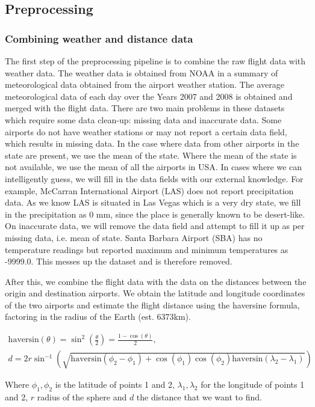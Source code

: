 \documentclass[letterpaper,11pt]{article}
\begin{document}
\subsection{Preprocessing}
\subsubsection{Combining weather and distance data}
The first step of the preprocessing pipeline is to combine the raw flight data with weather data. The weather data is obtained from NOAA in a summary of meteorological data obtained from the airport weather station. The average meteorological data of each day over the Years 2007 and 2008 is obtained and merged with the flight data. There are two main problems in these datasets which require some data clean-up: missing data and inaccurate data. Some airports do not have weather stations or may not report a certain data field, which results in missing data. In the case where data from other airports in the state are present, we use the mean of the state. Where the mean of the state is not available, we use the mean of all the airports in USA. In cases where we can intelligently guess, we will fill in the data fields with our external knowledge. For example, McCarran International Airport (LAS) does not report precipitation data. As we know LAS is situated in Las Vegas which is a very dry state, we fill in the precipitation as 0 mm, since the place is generally known to be desert-like. On inaccurate data, we will remove the data field and attempt to fill it up as per missing data, i.e. mean of state. Santa Barbara Airport (SBA) has no temperature readings but reported maximum and minimum temperatures as -9999.0. This messes up the dataset and is therefore removed. 

After this, we combine the flight data with the data on the distances between the origin and destination airports. We obtain the latitude and longitude coordinates of the two airports and estimate the flight distance using the haversine formula, factoring in the radius of the Earth (est. 6373km).

\begin{multline}
\scriptstyle \text{haversin}(\theta)=\sin^2\left(\frac\theta2\right)=\frac{1-\cos(\theta)}2, \\
\scriptstyle d=2r\sin^{-1}\left(\sqrt{\text{haversin}(\phi_2-\phi_1)+\cos(\phi_1)\cos(\phi_2)\text{haversin}(\lambda_2-\lambda_1)}\right)
\end{multline}

Where $\phi_1, \phi_2$ is the latitude of points 1 and 2, $\lambda_1, \lambda_2$ for the longitude of points 1 and 2, $r$ radius of the sphere and $d$ the distance that we want to find.
\end{document}
